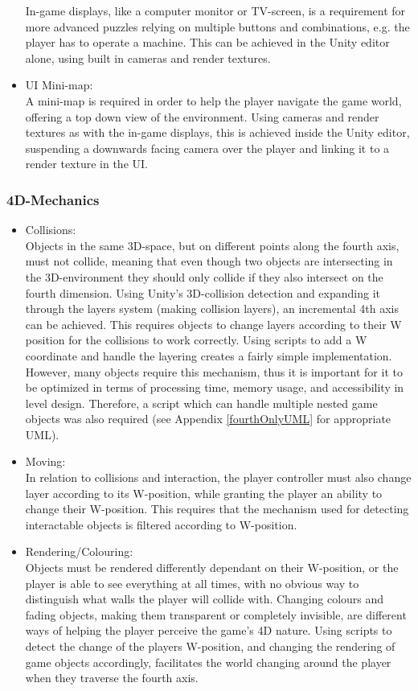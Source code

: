 \begin{itemize}
	In-game displays, like a computer monitor or TV-screen, is a requirement for more advanced puzzles relying on multiple buttons and combinations, e.g. the player has to operate a machine. This can be achieved in the Unity editor alone, using built in cameras and render textures.
	\item UI Mini-map:\\
	 A mini-map is required in order to help the player navigate the game world, offering a top down view of the environment. Using cameras and render textures as with the in-game displays, this is achieved inside the Unity editor, suspending a downwards facing camera over the player and linking it to a render texture in the UI.
\end{itemize}

\subsubsection{4D-Mechanics}
\begin{itemize}
	\item Collisions:\\
	Objects in the same 3D-space, but on different points along the fourth axis, must not collide, meaning that even though two objects are intersecting in the 3D-environment they should only collide if they also intersect on the fourth dimension. Using Unity's 3D-collision detection and expanding it through the layers system (making collision layers), an incremental 4th axis can be achieved. This requires objects to change layers according to their W position for the collisions to work correctly. Using scripts to add a W coordinate and handle the layering creates a fairly simple implementation. However, many objects require this mechanism, thus it is important for it to be optimized in terms of processing time, memory usage, and accessibility in level design. Therefore, a script which can handle multiple nested game objects was also required (see Appendix \ref{fourthOnlyUML} for appropriate UML). 
	\item Moving:\\
	In relation to collisions and interaction, the player controller must also change layer according to its W-position, while granting the player an ability to change their W-position. This requires that the mechanism used for detecting interactable objects is filtered according to W-position.
	\item Rendering/Colouring:\\
	Objects must be rendered differently dependant on their W-position, or the player is able to see everything at all times, with no obvious way to distinguish what walls the player will collide with. Changing colours and fading objects, making them transparent or completely invisible, are different ways of helping the player perceive the game's 4D nature. Using scripts to detect the change of the players W-position, and changing the rendering of game objects accordingly, facilitates the world changing around the player when they traverse the fourth axis.
\end{itemize}